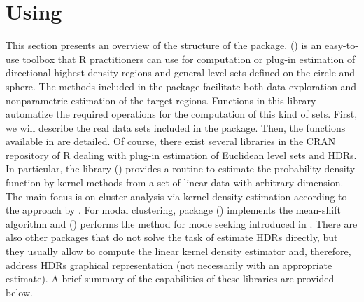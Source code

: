 \section{Using }\label{sec:3}

This section presents an overview of the structure of the package.  (\citealp{HDiR}) is an easy-to-use toolbox that R practitioners can use for computation or plug-in estimation of directional highest density regions and general level sets defined on the circle and sphere. The methods included in the package facilitate both data exploration and nonparametric estimation of the target regions. Functions in this library automatize the required operations for the computation of this kind of sets. First, we will describe the real data sets included in the package. Then, the functions available in  are detailed. Of course, there exist several libraries in the CRAN repository of R dealing with plug-in estimation of Euclidean level sets and HDRs. In particular, the library  (\citealp{azzalini2014package}) provides a routine to estimate the probability density function by kernel methods from a set of linear data with arbitrary dimension. The main focus is on cluster analysis via kernel density estimation according to the approach by \cite{hartigan1975clustering}.  For modal clustering, package  (\citealp{einbeck46lpcm}) implements the mean-shift algorithm and  (\citealp{cheng2014parallel}) performs the method for mode
seeking introduced in \cite{li2007nonparametric}. There are also other packages that do not solve the task of estimate HDRs directly, but they usually allow to compute the linear kernel density estimator and, therefore, address HDRs graphical representation (not necessarily with an appropriate estimate). A brief summary of the capabilities of these libraries are provided below.

